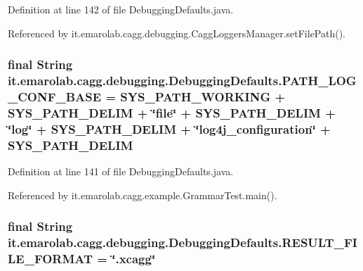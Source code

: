Definition at line 142 of file Debugging\-Defaults.\-java.



Referenced by it.\-emarolab.\-cagg.\-debugging.\-Cagg\-Loggers\-Manager.\-set\-File\-Path().

\hypertarget{classit_1_1emarolab_1_1cagg_1_1debugging_1_1DebuggingDefaults_a234dc33c418c2f57b65a6df9b8dee986}{
\subsubsection[{P\-A\-T\-H\-\_\-\-L\-O\-G\-\_\-\-C\-O\-N\-F\-\_\-\-B\-A\-S\-E}]{\setlength{\rightskip}{0pt plus 5cm}final String it.\-emarolab.\-cagg.\-debugging.\-Debugging\-Defaults.\-P\-A\-T\-H\-\_\-\-L\-O\-G\-\_\-\-C\-O\-N\-F\-\_\-\-B\-A\-S\-E = {\bf S\-Y\-S\-\_\-\-P\-A\-T\-H\-\_\-\-W\-O\-R\-K\-I\-N\-G} + {\bf S\-Y\-S\-\_\-\-P\-A\-T\-H\-\_\-\-D\-E\-L\-I\-M} + \char`\"{}file\char`\"{} + S\-Y\-S\-\_\-\-P\-A\-T\-H\-\_\-\-D\-E\-L\-I\-M + \char`\"{}log\char`\"{} + S\-Y\-S\-\_\-\-P\-A\-T\-H\-\_\-\-D\-E\-L\-I\-M + \char`\"{}log4j\-\_\-configuration\char`\"{} + S\-Y\-S\-\_\-\-P\-A\-T\-H\-\_\-\-D\-E\-L\-I\-M\hspace{0.3cm}{\ttfamily [static]}}}\label{classit_1_1emarolab_1_1cagg_1_1debugging_1_1DebuggingDefaults_a234dc33c418c2f57b65a6df9b8dee986}


Definition at line 141 of file Debugging\-Defaults.\-java.



Referenced by it.\-emarolab.\-cagg.\-example.\-Grammar\-Test.\-main().

\hypertarget{classit_1_1emarolab_1_1cagg_1_1debugging_1_1DebuggingDefaults_ac8aa784986458ca02636c8ebd74a049e}{
\subsubsection[{R\-E\-S\-U\-L\-T\-\_\-\-F\-I\-L\-E\-\_\-\-F\-O\-R\-M\-A\-T}]{\setlength{\rightskip}{0pt plus 5cm}final String it.\-emarolab.\-cagg.\-debugging.\-Debugging\-Defaults.\-R\-E\-S\-U\-L\-T\-\_\-\-F\-I\-L\-E\-\_\-\-F\-O\-R\-M\-A\-T = \char`\"{}.xcagg\char`\"{}\hspace{0.3cm}{\ttfamily [static]}}}\label{classit_1_1emarolab_1_1cagg_1_1debugging_1_1DebuggingDefaults_ac8aa784986458ca02636c8ebd74a049e}


